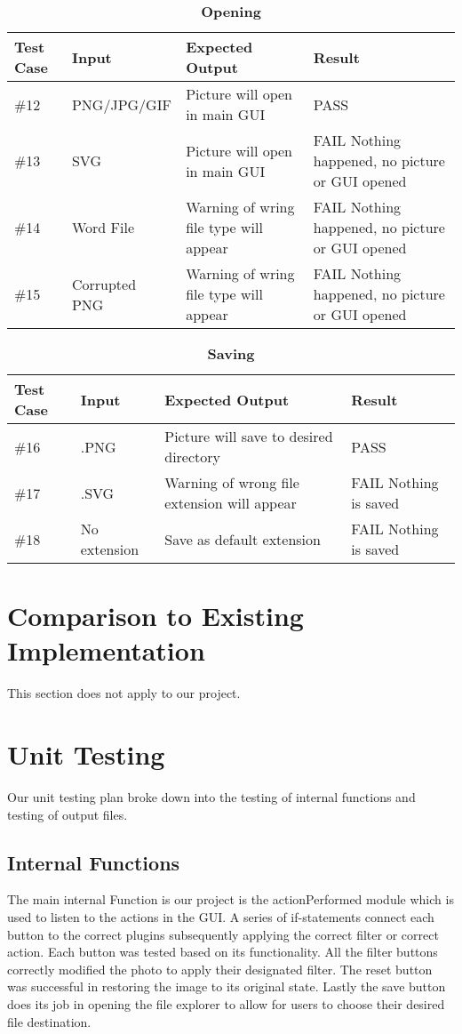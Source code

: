 \documentclass[12pt, titlepage]{article}
\begin{document}
\begin{table}[!hb]
\scriptsize
\caption{\bf Opening}
\begin{tabu} to 1.1\textwidth { | X[.3] | X[.7] | X[.7] | X[.7] |}
\hline
	      		Test Case & Input & Expected Output & Result \\
\hline
\#12
& PNG/JPG/GIF
& Picture will open in main GUI
& PASS\\
\hline
\#13
& SVG
& Picture will open in main GUI
& FAIL Nothing happened, no picture or GUI opened\\
\hline
\#14
& Word File
& Warning of wring file type will appear
& FAIL Nothing happened, no picture or GUI opened\\
\hline
\#15
& Corrupted PNG
& Warning of wring file type will appear
& FAIL Nothing happened, no picture or GUI opened\\
\hline
	\end{tabu}
	\end{table}

\begin{table}[h]
\scriptsize
\caption{\bf Saving}
\begin{tabu} to 1.1\textwidth { | X[.3] | X[.7] | X[.7] | X[.7] |}
\hline
	      		Test Case & Input & Expected Output & Result \\
\hline
\#16
& .PNG
& Picture will save to desired directory
& PASS\\
\hline
\#17
& .SVG
& Warning of wrong file extension will appear
& FAIL Nothing is saved\\
\hline
\#18
& No extension
& Save as default extension
& FAIL Nothing is saved\\
\hline
	\end{tabu}
	\end{table}


\section{Comparison to Existing Implementation}	
This section does not apply to our project.

\section{Unit Testing}
Our unit testing plan broke down into the testing of internal functions and testing of output files.
\subsection{Internal Functions}
The main internal Function is our project is the actionPerformed module which is used to listen to the actions in the GUI. A series of if-statements connect each button to the correct plugins subsequently applying the correct filter or correct action. Each button was tested based on its functionality. All the filter buttons correctly modified the photo to apply their designated filter. The reset button was successful in restoring the image to its original state. Lastly the save button does its job in opening the file explorer to allow for users to choose their desired file destination.
\end{document}
